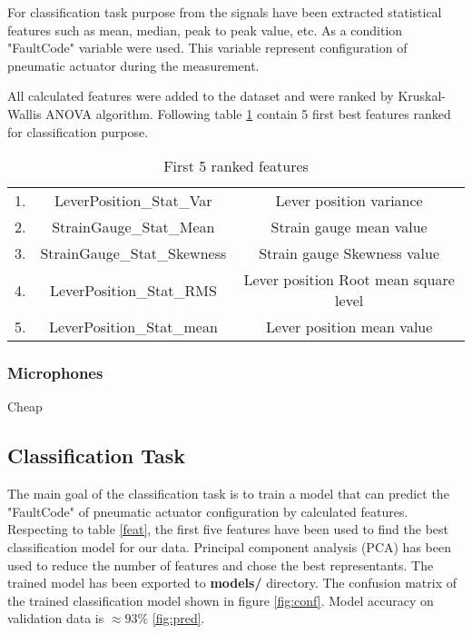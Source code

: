 \documentclass[class=article, crop=false]{standalone}
\begin{document}
For classification task purpose from the signals have been extracted
statistical features such as mean, median, peak to peak value, etc.
As a condition "FaultCode" variable
were used. This variable represent configuration of pneumatic actuator
during the measurement.

All calculated features were added to the dataset and were ranked by
Kruskal-Wallis ANOVA algorithm. Following table \ref{tab:feat} contain
5 first best features ranked for classification purpose.

\begin{table}[h]
    \centering
    \begin{tabular}{|c|c|c|}
        \hline
        1. & LeverPosition\_Stat\_Var & Lever position variance \\
        2. & StrainGauge\_Stat\_Mean  & Strain gauge mean value \\
        3. & StrainGauge\_Stat\_Skewness  & Strain gauge Skewness value \\
        4. & LeverPosition\_Stat\_RMS  & Lever position Root mean square
        level \\
        5. & LeverPosition\_Stat\_mean  & Lever position mean value \\ 
        \hline
    \end{tabular}
    \caption{First 5 ranked features}
    \label{tab:feat}
\end{table}

\subsubsection{Microphones}
Cheap



\subsection{Classification Task}

The main goal of the classification task is to train a model that can
predict the "FaultCode" of pneumatic actuator configuration by
calculated features.
Respecting to table \ref{feat}, the first five features have been used to
find the best classification model for our data.
Principal component analysis (PCA) has been used to reduce the number of
features and chose the best representants.
The trained model has been exported to
\textbf{models/} directory.
The confusion matrix of the trained classification model shown in figure
\ref{fig:conf}. Model accuracy on validation data is $\approx 93 \%$
\ref{fig:pred}.
\end{document}
